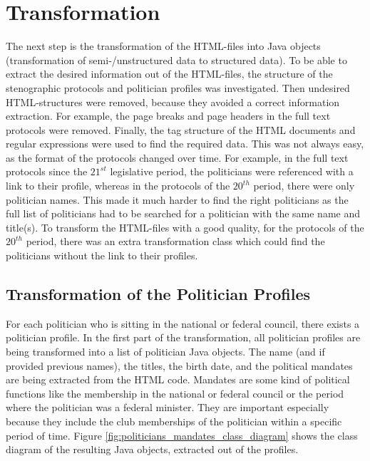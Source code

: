 \section{Transformation}
The next step is the transformation of the HTML-files into Java objects (transformation of semi-/unstructured data to structured data). To be able to extract the desired information out of the HTML-files, the structure of the stenographic protocols and politician profiles was investigated. Then undesired HTML-structures were removed, because they avoided a correct information extraction. For example, the page breaks and page headers in the full text protocols were removed. Finally, the tag structure of the HTML documents and regular expressions were used to find the required data. This was not always easy, as the format of the protocols changed over time. For example, in the full text protocols since the $21^{st}$ legislative period, the politicians were referenced with a link to their profile, whereas in the protocols of the $20^{th}$ period, there were only politician names. This made it much harder to find the right politicians as the full list of politicians had to be searched for a politician with the same name and title(s). To transform the HTML-files with a good quality, for the protocols of the $20^{th}$ period, there was an extra transformation class which could find the politicians without the link to their profiles.

\subsection{Transformation of the Politician Profiles}
For each politician who is sitting in the national or federal council, there exists a politician profile. In the first part of the transformation, all politician profiles are being transformed into a list of politician Java objects. The name (and if provided previous names), the titles, the birth date, and the political mandates are being extracted from the HTML code. Mandates are some kind of political functions like the membership in the national or federal council or the period where the politician was a federal minister. They are important especially because they include the club memberships of the politician within a specific period of time. 
Figure \ref{fig:politicians_mandates_class_diagram} shows the class diagram of the resulting Java objects, extracted out of the profiles.


